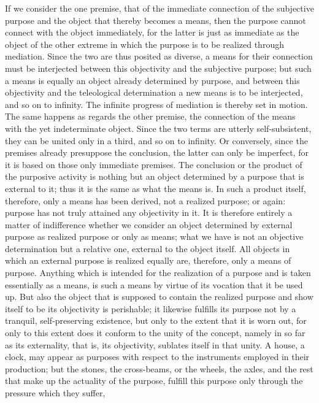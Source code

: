 If we consider the one premise,
that of the immediate connection of
the subjective purpose and the object
that thereby becomes a means,
then the purpose cannot
connect with the object immediately,
for the latter is just as immediate as
the object of the other extreme
in which the purpose is to be
realized through mediation.
Since the two are thus posited as diverse,
a means for their connection must be
interjected between this objectivity
and the subjective purpose;
but such a means is equally an
object already determined by purpose,
and between this objectivity
and the teleological determination
a new means is to be interjected,
and so on to infinity.
The infinite progress of mediation is
thereby set in motion.
The same happens as regards the other premise,
the connection of the means
with the yet indeterminate object.
Since the two terms are utterly self-subsistent,
they can be united only in a third,
and so on to infinity.
Or conversely, since the premises
already presuppose the conclusion,
the latter can only be imperfect,
for it is based on those only immediate premises.
The conclusion or the product of
the purposive activity is
nothing but an object determined
by a purpose that is external to it;
thus it is the same as what the means is.
In such a product itself, therefore,
only a means has been derived,
not a realized purpose;
or again:
purpose has not truly attained any objectivity in it.
It is therefore entirely a matter of indifference
whether we consider an object
determined by external purpose
as realized purpose or only as means;
what we have is not an objective determination
but a relative one,
external to the object itself.
All objects in which an external purpose is
realized equally are, therefore, only a means of purpose.
Anything which is intended for the realization of a purpose
and is taken essentially as a means,
is such a means by virtue of
its vocation that it be used up.
But also the object that is supposed to
contain the realized purpose
and show itself to be its objectivity is perishable;
it likewise fulfills its purpose not by
a tranquil, self-preserving existence,
but only to the extent that it is worn out,
for only to this extent does
it conform to the unity of the concept,
namely in so far as its externality,
that is, its objectivity,
sublates itself in that unity.
A house, a clock, may appear as purposes
with respect to the instruments
employed in their production;
but the stones, the cross-beams,
or the wheels, the axles,
and the rest that make up
the actuality of the purpose,
fulfill this purpose only
through the pressure which they suffer,
